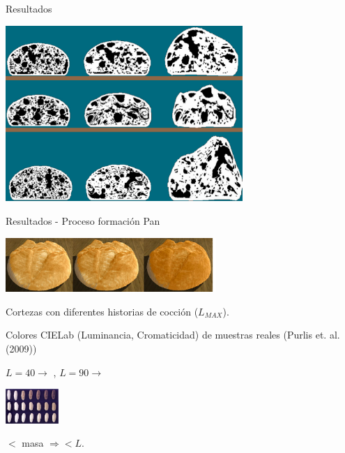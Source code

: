 \documentclass[spanish,unknownkeysallowed,10pt]{beamer}
\begin{document}
\begin{frame}{Resultados}

\centerline{\includegraphics[width=9cm]{../figures/Fig9}}

\end{frame}

\begin{frame}{Resultados - Proceso formación Pan}

\centerline{\includegraphics[width=8cm]{../figures/Fig13}}
Cortezas con diferentes historias de cocción ($L_{MAX}$).

\vspace{0.2cm}

Colores CIELab (Luminancia, Cromaticidad) de muestras reales (Purlis et. al. (2009))

\vspace{0.2cm}

$L = 40 \rightarrow$ , $L = 90 \rightarrow$ 

\vspace{0.2cm}

\centerline{\includegraphics[width=2cm]{../figures/browning}}



$<$ masa $\Rightarrow < L$.

\end{frame}
\end{document}
